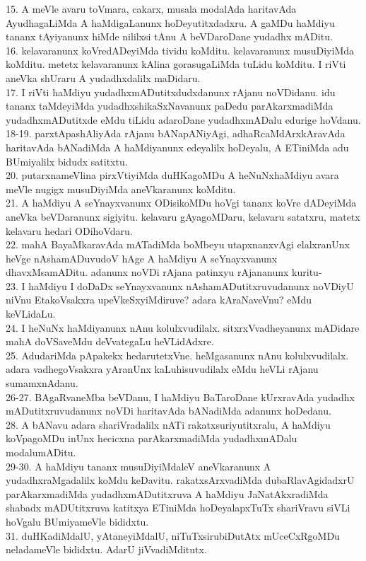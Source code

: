 \documentclass{article}
\begin{document}
15. A meVle avaru toVmara, cakarx, musala modalAda haritavAda AyudhagaLiMda A haMdigaLanunx hoDeyutitxdadxru. A gaMDu haMdiyu tananx tAyiyanunx hiMde nililxsi tAnu A beVDaroDane yudadhx mADitu.\\
16. kelavaranunx koVredADeyiMda tividu koMditu. kelavaranunx musuDiyiMda koMditu. metetx kelavaranunx kAlina gorasugaLiMda tuLidu koMditu. I riVti aneVka shUraru A yudadhxdalilx maDidaru.\\
17. I riVti haMdiyu yudadhxmADutitxdudxdanunx rAjanu noVDidanu. idu tananx taMdeyiMda yudadhxshikaSxNavanunx paDedu parAkarxmadiMda yudadhxmADutitxde eMdu tiLidu adaroDane yudadhxmADalu edurige hoVdanu.\\
18-19. parxtApashAliyAda rAjanu bANapANiyAgi, adhaRcaMdArxkAravAda haritavAda bANadiMda A haMdiyanunx edeyalilx hoDeyalu, A ETiniMda adu BUmiyalilx bidudx satitxtu.\\
20. putarxnameVlina pirxVtiyiMda duHKagoMDu A heNuNxhaMdiyu avara meVle nugigx musuDiyiMda aneVkaranunx koMditu.\\
21. A haMdiyu A seYnayxvanunx ODisikoMDu hoVgi tananx koVre dADeyiMda aneVka beVDaranunx sigiyitu. kelavaru gAyagoMDaru, kelavaru satatxru, matetx kelavaru hedari ODihoVdaru.\\
22. mahA BayaMkaravAda mATadiMda boMbeyu utapxnanxvAgi elalxranUnx heVge nAshamADuvudoV hAge A haMdiyu A seYnayxvanunx dhavxMsamADitu. adanunx noVDi rAjana patinxyu rAjananunx kuritu-\\
23. I haMdiyu I doDaDx seYnayxvanunx nAshamADutitxruvudanunx noVDiyU niVnu EtakoVsakxra upeVkeSxyiMdiruve? adara kAraNaveVnu? eMdu keVLidaLu.\\
24. I heNuNx haMdiyanunx nAnu kolulxvudilalx. sitxrxVvadheyanunx mADidare mahA doVSaveMdu deVvategaLu heVLidAdxre.\\
25. AdudariMda pApakekx hedarutetxVne. heMgasanunx nAnu kolulxvudilalx. adara vadhegoVsakxra yAranUnx kaLuhisuvudilalx eMdu heVLi rAjanu sumamxnAdanu.\\
26-27. BAgaRvaneMba beVDanu, I haMdiyu BaTaroDane kUrxravAda yudadhx mADutitxruvudanunx noVDi haritavAda bANadiMda adanunx hoDedanu.\\
28. A bANavu adara shariVradalilx nATi rakatxsuriyutitxralu, A haMdiyu koVpagoMDu inUnx hecicxna parAkarxmadiMda yudadhxmADalu modalumADitu.\\
29-30. A haMdiyu tananx musuDiyiMdaleV aneVkaranunx A yudadhxraMgadalilx koMdu keDavitu. rakatxsArxvadiMda dubaRlavAgidadxrU parAkarxmadiMda yudadhxmADutitxruva A haMdiyu JaNatAkxradiMda shabadx mADUtitxruva katitxya ETiniMda hoDeyalapxTuTx shariVravu siVLi hoVgalu BUmiyameVle bididxtu.\\
31. duHKadiMdalU, yAtaneyiMdalU, niTuTxsirubiDutAtx mUceCxRgoMDu neladameVle bididxtu. AdarU jiVvadiMditutx.\\
\end{document}
